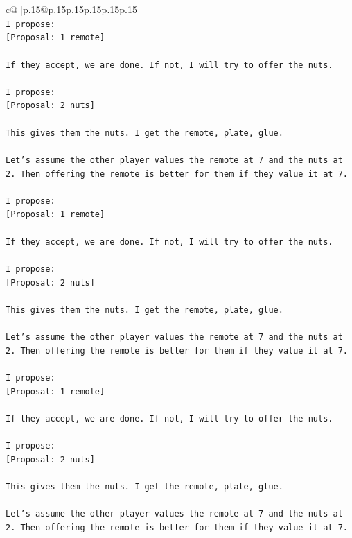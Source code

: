 \documentclass{article}
\begin{document}
{\begin{supertabular}{c@{$\;$}|p{.15\linewidth}@{}p{.15\linewidth}p{.15\linewidth}p{.15\linewidth}p{.15\linewidth}p{.15\linewidth}}
{{{\\ 
\texttt{I propose:} \\
\texttt{{[}Proposal: 1 remote{]}} \\
\\ 
\texttt{If they accept, we are done. If not, I will try to offer the nuts.} \\
\\ 
\texttt{I propose:} \\
\texttt{{[}Proposal: 2 nuts{]}} \\
\\ 
\texttt{This gives them the nuts. I get the remote, plate, glue.} \\
\\ 
\texttt{Let's assume the other player values the remote at 7 and the nuts at 2. Then offering the remote is better for them if they value it at 7.} \\
\\ 
\texttt{I propose:} \\
\texttt{{[}Proposal: 1 remote{]}} \\
\\ 
\texttt{If they accept, we are done. If not, I will try to offer the nuts.} \\
\\ 
\texttt{I propose:} \\
\texttt{{[}Proposal: 2 nuts{]}} \\
\\ 
\texttt{This gives them the nuts. I get the remote, plate, glue.} \\
\\ 
\texttt{Let's assume the other player values the remote at 7 and the nuts at 2. Then offering the remote is better for them if they value it at 7.} \\
\\ 
\texttt{I propose:} \\
\texttt{{[}Proposal: 1 remote{]}} \\
\\ 
\texttt{If they accept, we are done. If not, I will try to offer the nuts.} \\
\\ 
\texttt{I propose:} \\
\texttt{{[}Proposal: 2 nuts{]}} \\
\\ 
\texttt{This gives them the nuts. I get the remote, plate, glue.} \\
\\ 
\texttt{Let's assume the other player values the remote at 7 and the nuts at 2. Then offering the remote is better for them if they value it at 7.} \\
}}}
\end{supertabular}}
\end{document}
